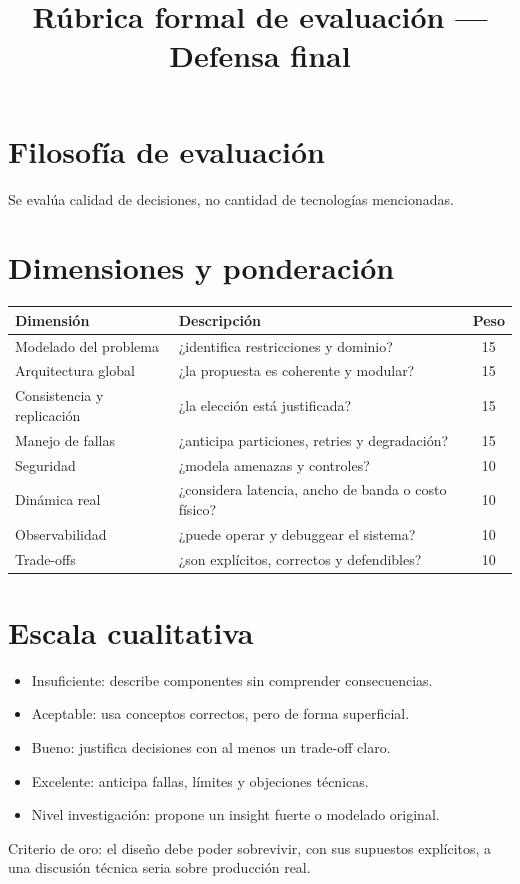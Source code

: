 \documentclass{ua-engineering-v6-article}
\title{Rúbrica formal de evaluación --- Defensa final}
\author{\UAProfessor}
\date{\UADate}
\begin{document}
\maketitle

\section{Filosofía de evaluación}
Se evalúa calidad de decisiones, no cantidad de tecnologías mencionadas.

\section{Dimensiones y ponderación}
\begin{center}
\begin{tabular}{p{5.2cm} p{7cm} c}
\toprule
Dimensión & Descripción & Peso \\
\midrule
Modelado del problema & ¿identifica restricciones y dominio? & 15 \\
Arquitectura global & ¿la propuesta es coherente y modular? & 15 \\
Consistencia y replicación & ¿la elección está justificada? & 15 \\
Manejo de fallas & ¿anticipa particiones, retries y degradación? & 15 \\
Seguridad & ¿modela amenazas y controles? & 10 \\
Dinámica real & ¿considera latencia, ancho de banda o costo físico? & 10 \\
Observabilidad & ¿puede operar y debuggear el sistema? & 10 \\
Trade-offs & ¿son explícitos, correctos y defendibles? & 10 \\
\bottomrule
\end{tabular}
\end{center}

\section{Escala cualitativa}
\begin{itemize}
\item Insuficiente: describe componentes sin comprender consecuencias.
\item Aceptable: usa conceptos correctos, pero de forma superficial.
\item Bueno: justifica decisiones con al menos un trade-off claro.
\item Excelente: anticipa fallas, límites y objeciones técnicas.
\item Nivel investigación: propone un insight fuerte o modelado original.
\end{itemize}

\begin{uakeybox}
Criterio de oro: el diseño debe poder sobrevivir, con sus supuestos explícitos, a una discusión técnica seria sobre producción real.
\end{uakeybox}
\end{document}
